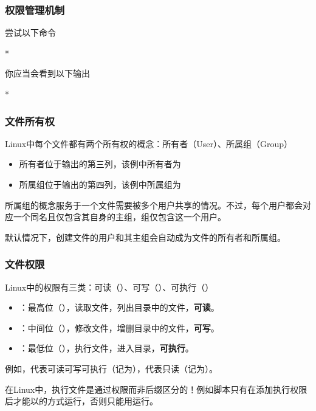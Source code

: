 \begin{frame}
    \frametitle{权限管理机制}
    尝试以下命令
    \begin{Code}*
        
    \end{Code}
    你应当会看到以下输出
    \begin{Code}*
        
    \end{Code}
\end{frame}

\begin{frame}
    \frametitle{文件所有权}
    Linux中每个文件都有两个所有权的概念：所有者（User）、所属组（Group）
    \begin{itemize}
        \item 所有者位于输出的第三列，该例中所有者为
        \item 所属组位于输出的第四列，该例中所属组为
    \end{itemize}
    所属组的概念服务于一个文件需要被多个用户共享的情况。不过，每个用户都会对应一个同名且仅包含其自身的主组，组仅包含这一个用户。
    
    默认情况下，创建文件的用户和其主组会自动成为文件的所有者和所属组。
\end{frame}

\begin{frame}
    \frametitle{文件权限}
    Linux中的权限有三类：可读（）、可写（）、可执行（）
    \begin{itemize}
        \item {}：最高位（），读取文件，列出目录中的文件，\textbf{可读}。
        \item {}：中间位（），修改文件，增删目录中的文件，\textbf{可写}。
        \item {}：最低位（），执行文件，进入目录，\textbf{可执行}。
    \end{itemize}
    例如，代表可读可写可执行（记为），代表只读（记为）。

    在Linux中，执行文件是通过权限而非后缀区分的！例如脚本只有在添加执行权限后才能以的方式运行，否则只能用运行。
\end{frame}

